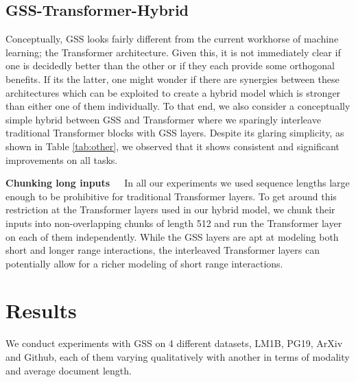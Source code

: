 \subsection{GSS-Transformer-Hybrid}\label{sec:hybrid}
Conceptually, GSS looks fairly different from the current workhorse of machine learning; the Transformer architecture. Given this, it is not immediately clear if one is decidedly better than the other or if they each provide some orthogonal benefits. If its the latter, one might wonder if there are synergies between these architectures which can be exploited to create a hybrid model which is stronger than either one of them individually. To that end, we also consider a conceptually simple hybrid between GSS and Transformer where we sparingly interleave traditional Transformer blocks with GSS layers. Despite its glaring simplicity, as shown in Table \ref{tab:other}, we observed that it shows consistent and significant improvements on all tasks.

\textbf{Chunking long inputs}\ \ \ In all our experiments we used sequence lengths large enough to be prohibitive for traditional Transformer layers. To get around this restriction at the Transformer layers used in our hybrid model, we chunk their inputs into non-overlapping chunks of length 512 and run the Transformer layer on each of them independently. While the GSS layers are apt at modeling both short and longer range interactions, the interleaved Transformer layers can potentially allow for a richer modeling of short range interactions. 


\section{Results}
We conduct experiments with GSS on 4 different datasets, LM1B, PG19, ArXiv and Github, each of them varying qualitatively with another in terms of modality and average document length.

